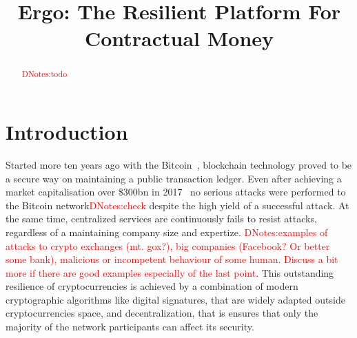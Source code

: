 \documentclass[]{article}
\newcommand{\dnote}[1]{{\textcolor{red}{DNotes:{#1}}}}
\begin{document}
    \title{Ergo: The Resilient Platform For Contractual Money}


    \maketitle

    \begin{abstract}
        \dnote{todo}
    \end{abstract}



    \section{Introduction}


    Started more ten years ago with the Bitcoin~\cite{nakamoto2008bitcoin}, blockchain technology proved to be a secure way on maintaining
    a public transaction ledger.
    Even after achieving a market capitalisation over \$300bn in 2017~\cite{btcPrice}
    no serious attacks were performed to the Bitcoin network\dnote{check} despite the high yield of a successful attack.
    At the same time, centralized services are continuously fails to resist attacks, regardless of a maintaining company size and expertize.
    \dnote{examples of attacks to crypto exchanges (mt. gox?), big companies (Facebook? Or better some bank), malicious or incompetent behaviour of some human.
    Discuss a bit more if there are good examples especially of the last point}.
    This outstanding resilience of cryptocurrencies is achieved by a combination of modern cryptographic algorithms like digital
    signatures, that are widely adapted outside cryptocurrencies space, and decentralization, that is ensures that only
    the majority of the network participants can affect its security.
\end{document}
